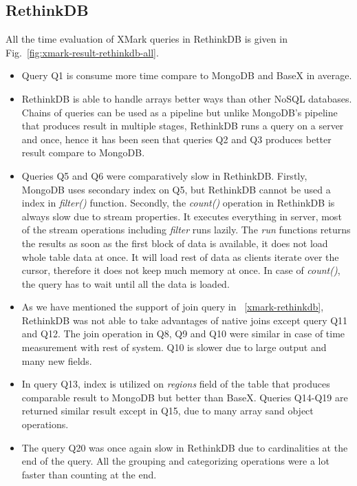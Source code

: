 \subsection{RethinkDB}
All the time evaluation of XMark queries in RethinkDB is given in Fig.~\ref{fig:xmark-result-rethinkdb-all}. 
\begin{itemize}
\item Query Q1 is consume more time compare to MongoDB and BaseX in average.
 \item  
  RethinkDB is able to handle arrays better ways than other NoSQL databases. Chains of queries can be used as a pipeline but unlike MongoDB's pipeline that produces result in multiple stages, RethinkDB runs a query on a server and once, hence it has been seen that queries Q2 and Q3 produces better result compare to MongoDB. 
 \item
 Queries Q5 and Q6 were comparatively slow in  RethinkDB. Firstly, MongoDB uses secondary index on Q5, but RethinkDB cannot be used a index in \textit{filter()} function. Secondly, the \textit{count()} operation in RethinkDB is always slow due to stream properties. It executes everything in server, most of the stream operations  including \textit{filter} runs lazily. The \textit{run} functions returns the results as soon as the first block of data is available, it does not load whole table data  at once. It will load rest of data as clients iterate over the cursor, therefore it does not keep much memory at once. In case of \textit{count()}, the query has to wait until all the data is loaded. 
 \item As we have mentioned the support of join query in ~\ref{xmark-rethinkdb}, RethinkDB was not able to take advantages of native joins except query Q11 and Q12. The join operation in Q8, Q9 and Q10 were similar in case of time measurement with rest of system. Q10 is slower due to large output and many new fields. 
 \item In query Q13, index is utilized on \textit{regions} field of the table that produces comparable result to MongoDB but better than BaseX. Queries Q14-Q19 are returned similar result except in Q15, due to many array sand object operations. 
\item The query Q20 was once again slow in RethinkDB due to cardinalities at the end of the query. All the grouping and categorizing operations were a lot faster than counting at the end. 
\end{itemize}

